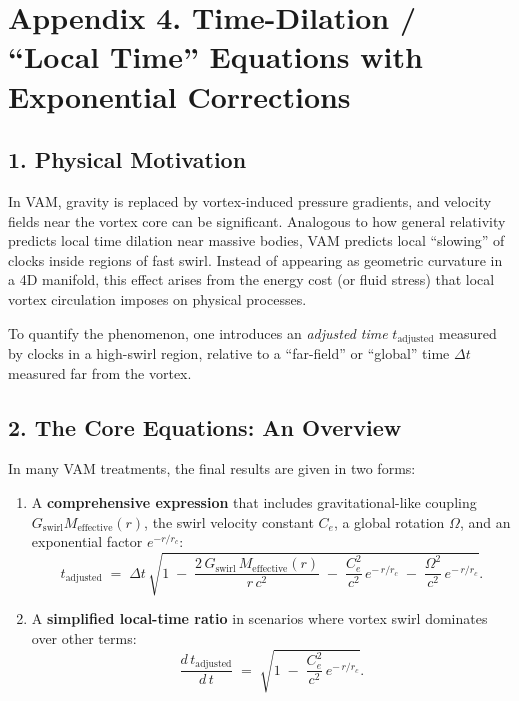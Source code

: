 

\section*{Appendix 4. Time-Dilation / “Local Time” Equations with Exponential Corrections}

\subsection*{1. Physical Motivation}

In VAM, gravity is replaced by vortex-induced pressure gradients, and velocity fields near the vortex core can be significant. Analogous to how general relativity predicts local time dilation near massive bodies, VAM predicts local “slowing” of clocks inside regions of fast swirl. Instead of appearing as geometric curvature in a 4D manifold, this effect arises from the energy cost (or fluid stress) that local vortex circulation imposes on physical processes.

To quantify the phenomenon, one introduces an \textit{adjusted time} \(t_\text{adjusted}\) measured by clocks in a high-swirl region, relative to a “far-field” or “global” time \(\Delta t\) measured far from the vortex.

\subsection*{2. The Core Equations: An Overview}

In many VAM treatments, the final results are given in two forms:

\begin{enumerate}
    \item A \textbf{comprehensive expression} that includes gravitational-like coupling \(G_\text{swirl} M_\text{effective}(r)\), the swirl velocity constant \(C_e\), a global rotation \(\Omega\), and an exponential factor \(e^{-r/r_c}\):
    \[
        t_\text{adjusted}
        \;=\;
        \Delta t \,\sqrt{
            1
            \;-\;
            \frac{2\,G_\text{swirl}\,M_\text{effective}(r)}{r\,c^2}
            \;-\;
            \frac{C_e^2}{c^2}\, e^{-\,r/r_c}
            \;-\;
            \frac{\Omega^2}{c^2}\, e^{-\,r/r_c}
        }.
    \]
    \item A \textbf{simplified local-time ratio} in scenarios where vortex swirl dominates over other terms:
    \[
        \frac{d\,t_\text{adjusted}}{d\,t}
        \;=\;
        \sqrt{
            1
            \;-\;
            \frac{C_e^2}{c^2}\, e^{-\,r/r_c}
        }.
    \]
\end{enumerate}

